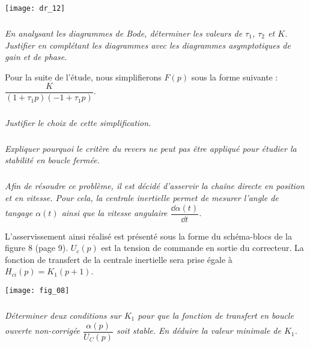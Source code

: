 \begin{multicols}{2}
\begin{center}
\texttt{[image: dr\_12]}
\end{center}

\subparagraph{} \textit{En analysant les diagrammes de Bode, déterminer les valeurs de $\tau_1$, $\tau_2$ et $K$. Justifier en complétant les diagrammes avec les diagrammes asymptotiques de
gain et de phase.}
\ifprof
\begin{corrige}
\end{corrige}
\else
\fi

Pour la suite de l'étude, nous simplifierons $F(p)$ sous la forme suivante : $\dfrac{K}{(1+\tau_1p)(-1+ \tau_1p)}$.




\subparagraph{} \textit{Justifier le choix de cette simplification.}
\ifprof
\begin{corrige}
\end{corrige}
\else
\fi


\subparagraph{} \textit{Expliquer pourquoi le critère du revers ne peut pas être appliqué pour étudier la stabilité en boucle
fermée.}
\ifprof
\begin{corrige}
\end{corrige}
\else
\fi


\subparagraph{} \textit{Afin de résoudre ce problème, il est décidé d'asservir la chaîne directe en position et en vitesse. Pour cela, la centrale inertielle permet de mesurer l'angle de tangage $\alpha (t )$ ainsi que la vitesse angulaire $\dfrac{\dd \alpha(t)}{\dd t}$.}
\ifprof
\begin{corrige}
\end{corrige}
\else
\fi


L'asservissement ainsi réalisé est présenté sous la forme du schéma-blocs de la figure 8 (page 9).
$U_c (p)$ est la tension de commande en sortie du correcteur. La fonction de transfert de la centrale inertielle
sera prise égale à $H_{c i}(p)=K_1(p+1)$.

\begin{center}
\texttt{[image: fig\_08]}
\end{center}



\subparagraph{} \textit{Déterminer deux conditions sur $K_1$ pour que la fonction de transfert en boucle ouverte non-corrigée $\dfrac{\alpha (p)}{U_C(p)}$ soit stable. En déduire la valeur minimale de $K_1$.}
\ifprof
\begin{corrige}
\end{corrige}
\else
\fi




\end{multicols}
